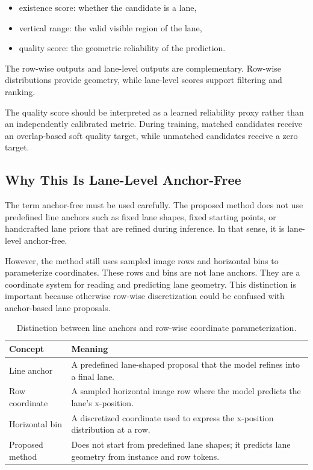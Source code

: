\documentclass[conference]{IEEEtran}
\begin{document}
\begin{itemize}
    \item existence score: whether the candidate is a lane,
    \item vertical range: the valid visible region of the lane,
    \item quality score: the geometric reliability of the prediction.
\end{itemize}

The row-wise outputs and lane-level outputs are complementary. Row-wise distributions provide geometry, while lane-level scores support filtering and ranking.

The quality score should be interpreted as a learned reliability proxy rather than an independently calibrated metric. During training, matched candidates receive an overlap-based soft quality target, while unmatched candidates receive a zero target.

\subsection{Why This Is Lane-Level Anchor-Free}

The term anchor-free must be used carefully. The proposed method does not use predefined line anchors such as fixed lane shapes, fixed starting points, or handcrafted lane priors that are refined during inference. In that sense, it is lane-level anchor-free.

However, the method still uses sampled image rows and horizontal bins to parameterize coordinates. These rows and bins are not lane anchors. They are a coordinate system for reading and predicting lane geometry. This distinction is important because otherwise row-wise discretization could be confused with anchor-based lane proposals.

\begin{table}[t]
\centering
\caption{Distinction between line anchors and row-wise coordinate parameterization.}
\label{tab:anchorfree}
\begin{tabularx}{\linewidth}{lX}
\toprule
Concept & Meaning \\
\midrule
Line anchor & A predefined lane-shaped proposal that the model refines into a final lane. \\
Row coordinate & A sampled horizontal image row where the model predicts the lane's x-position. \\
Horizontal bin & A discretized coordinate used to express the x-position distribution at a row. \\
Proposed method & Does not start from predefined lane shapes; it predicts lane geometry from instance and row tokens. \\
\bottomrule
\end{tabularx}
\end{table}
\end{document}
